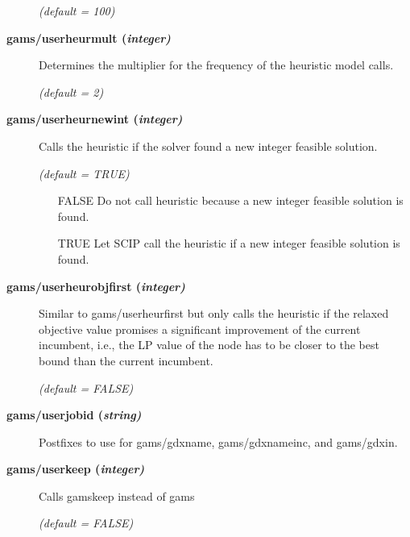\begin{description}
\textsl{(default = 100)}

\item[\label{scipuserheurmult}\hypertarget{scipuserheurmult}
{\textbf{gams/userheurmult (\slshape{integer})}}]\hspace{1.0in}

Determines the multiplier for the frequency of the heuristic model calls.

\textsl{(default = 2)}

\item[\label{scipuserheurnewint}\hypertarget{scipuserheurnewint}
{\textbf{gams/userheurnewint (\slshape{integer})}}]\hspace{1.0in}

Calls the heuristic if the solver found a new integer feasible solution.

\textsl{(default = TRUE)}
\begin{itemize}
\item[FALSE] Do not call heuristic because a new integer feasible solution is found.
\item[TRUE] Let SCIP call the heuristic if a new integer feasible solution is found.
\end{itemize}

\item[\label{scipuserheurobjfirst}\hypertarget{scipuserheurobjfirst}
{\textbf{gams/userheurobjfirst (\slshape{integer})}}]\hspace{1.0in}

Similar to gams/userheurfirst but only calls the heuristic if the relaxed objective value promises a significant improvement of the current incumbent, i.e., the LP value of the node has to be closer to the best bound than the current incumbent.

\textsl{(default = FALSE)}

\item[\label{scipuserjobid}\hypertarget{scipuserjobid}
{\textbf{gams/userjobid (\slshape{string})}}]\hspace{1.0in}

Postfixes to use for gams/gdxname, gams/gdxnameinc, and gams/gdxin.


\item[\label{scipuserkeep}\hypertarget{scipuserkeep}
{\textbf{gams/userkeep (\slshape{integer})}}]\hspace{1.0in}

Calls gamskeep instead of gams

\textsl{(default = FALSE)}

\end{description}

